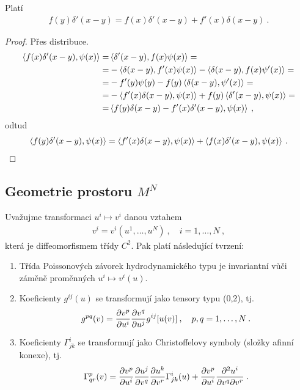 \begin{lemma} \label{lemma:delta}
    Platí
    \begin{align}
        f(y) \delta'(x-y) = f(x) \delta'(x-y) + f'(x) \delta(x-y) \:.
    \end{align}
\end{lemma}
\begin{proof}
    Přes distribuce.
    \begin{align*}
        \left \langle f(x) \delta'(x-y) ,\psi(x) \right \rangle 
        =& \left \langle \delta'(x-y) ,f(x) \psi(x) \right \rangle 
        = \\ =& -\left \langle \delta(x-y) ,f'(x)\psi(x) \right \rangle - \left \langle \delta(x-y) ,f(x)\psi'(x) \right \rangle 
        = \\ =& -f'(y) \psi(y) - f(y) \left \langle \delta(x-y) ,\psi'(x) \right \rangle 
        = \\ =& - \left \langle f'(x)  \delta(x-y) ,\psi(x) \right \rangle + f(y) \left \langle \delta'(x-y) ,\psi(x) \right \rangle 
        = \\ =& \left \langle f(y) \delta(x-y) - f'(x) \delta'(x-y) ,\psi(x) \right \rangle \:,
    \end{align*}
    odtud
    \begin{align}
        \left \langle f(y) \delta'(x-y) ,\psi(x) \right \rangle = \left \langle f'(x) \delta(x-y) ,\psi(x) \right \rangle + \left \langle f(x) \delta'(x-y) ,\psi(x) \right \rangle \:.
    \end{align} 
\end{proof}

\subsection{Geometrie prostoru $M^N$}

\begin{proposition} \label{prop:transoformace}
    Uvažujme transformaci $u^i \mapsto v^i $  danou vztahem
    \begin{align}
        v^i = v^i (u^1, \dots, u^N) \:, \quad i = 1, \dots, N \:, \label{eq:transform}
    \end{align}
    která je diffeomorfismem třídy $C^2$.
    Pak platí následující tvrzení:
    \begin{enumerate}
        \item Třída Poissonových závorek hydrodynamického typu je invariantní vůči záměně proměnných $u^i \mapsto v^i(u)$.
        \item Koeficienty $g^{ij}(u)$ se transformují jako tensory typu (0,2), tj.
        \begin{align}
            g^{pq}(v) = \frac{\partial v^p}{\partial u^i} \frac{\partial v^q}{\partial u^j} g^{ij}[u(v)] \:, \quad p, q = 1, \dots, N \:. \label{eq:transformace-metrika}
        \end{align}
        \item Koeficienty $\Gamma^i_{jk}$ se transformují jako Christoffelovy symboly (složky afinní konexe), tj.
        \begin{align}
            \Gamma^p_{qr} (v) = \frac{\partial v^p}{\partial u^i} \frac{\partial u^j}{\partial v^q} \frac{\partial u^k}{\partial v^r} \Gamma^i_{jk}(u) + \frac{\partial v^p}{\partial u^i} \frac{\partial^2 u^i}{\partial v^q \partial v^r} \:. \label{eq:transformace-konexe}
        \end{align}
    \end{enumerate}
\end{proposition}


